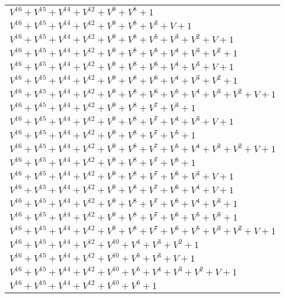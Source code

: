 \documentclass[12pt]{article}
\begin{document}
\begin{adjustwidth}{-4cm}{}
\begin{center}
\begin{longtable}{|l|}
$V^{16}  +V^{15}  +V^{14}  +V^{12}  +V^{9}  +V^{8}  + 1$ \\
$V^{16}  +V^{15}  +V^{14}  +V^{12}  +V^{9}  +V^{8}  +V^{3}  + V + 1$ \\
$V^{16}  +V^{15}  +V^{14}  +V^{12}  +V^{9}  +V^{8}  +V^{5}  +V^{3}  +V^{2}  + V + 1$ \\
$V^{16}  +V^{15}  +V^{14}  +V^{12}  +V^{9}  +V^{8}  +V^{5}  +V^{4}  +V^{3}  +V^{2}  + 1$ \\
$V^{16}  +V^{15}  +V^{14}  +V^{12}  +V^{9}  +V^{8}  +V^{6}  +V^{4}  +V^{3}  + V + 1$ \\
$V^{16}  +V^{15}  +V^{14}  +V^{12}  +V^{9}  +V^{8}  +V^{6}  +V^{4}  +V^{3}  +V^{2}  + 1$ \\
$V^{16}  +V^{15}  +V^{14}  +V^{12}  +V^{9}  +V^{8}  +V^{6}  +V^{5}  +V^{4}  +V^{3}  +V^{2}  + V + 1$ \\
$V^{16}  +V^{15}  +V^{14}  +V^{12}  +V^{9}  +V^{8}  +V^{7}  +V^{3}  + 1$ \\
$V^{16}  +V^{15}  +V^{14}  +V^{12}  +V^{9}  +V^{8}  +V^{7}  +V^{4}  +V^{3}  + V + 1$ \\
$V^{16}  +V^{15}  +V^{14}  +V^{12}  +V^{9}  +V^{8}  +V^{7}  +V^{5}  + 1$ \\
$V^{16}  +V^{15}  +V^{14}  +V^{12}  +V^{9}  +V^{8}  +V^{7}  +V^{5}  +V^{4}  +V^{3}  +V^{2}  + V + 1$ \\
$V^{16}  +V^{15}  +V^{14}  +V^{12}  +V^{9}  +V^{8}  +V^{7}  +V^{6}  + 1$ \\
$V^{16}  +V^{15}  +V^{14}  +V^{12}  +V^{9}  +V^{8}  +V^{7}  +V^{6}  +V^{3}  + V + 1$ \\
$V^{16}  +V^{15}  +V^{14}  +V^{12}  +V^{9}  +V^{8}  +V^{7}  +V^{6}  +V^{4}  + V + 1$ \\
$V^{16}  +V^{15}  +V^{14}  +V^{12}  +V^{9}  +V^{8}  +V^{7}  +V^{6}  +V^{4}  +V^{3}  + 1$ \\
$V^{16}  +V^{15}  +V^{14}  +V^{12}  +V^{9}  +V^{8}  +V^{7}  +V^{6}  +V^{5}  +V^{3}  + 1$ \\
$V^{16}  +V^{15}  +V^{14}  +V^{12}  +V^{9}  +V^{8}  +V^{7}  +V^{6}  +V^{5}  +V^{3}  +V^{2}  + V + 1$ \\
$V^{16}  +V^{15}  +V^{14}  +V^{12}  +V^{10}  +V^{4}  +V^{3}  +V^{2}  + 1$ \\
$V^{16}  +V^{15}  +V^{14}  +V^{12}  +V^{10}  +V^{5}  +V^{3}  + V + 1$ \\
$V^{16}  +V^{15}  +V^{14}  +V^{12}  +V^{10}  +V^{5}  +V^{4}  +V^{3}  +V^{2}  + V + 1$ \\
$V^{16}  +V^{15}  +V^{14}  +V^{12}  +V^{10}  +V^{6}  + 1$ \\

\end{longtable}
\end{center}
\end{adjustwidth}
\end{document}

